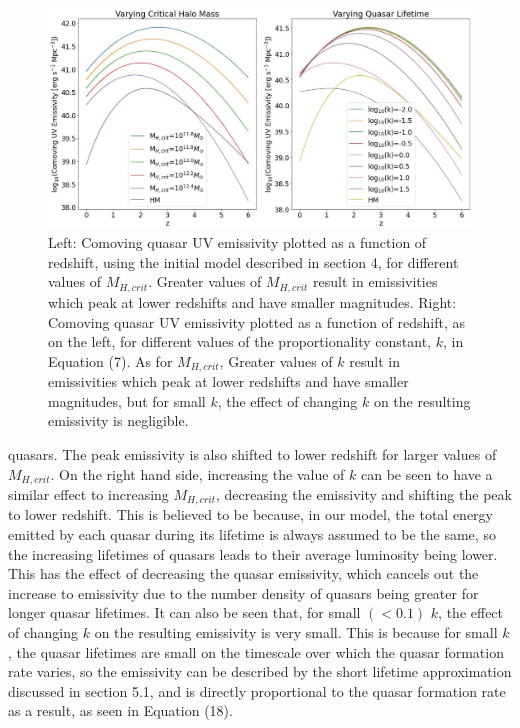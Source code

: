 \documentclass[12pt, twocolumn]{article}%
\begin{document}
 \begin{figure}[H]
     \centering
     \includegraphics[width=\linewidth]{Plot_9.jpeg}
     \caption{Left: Comoving quasar UV emissivity plotted as a function of redshift, using the initial model described in section 4, for different values of $M_{H,crit}$. Greater values of $M_{H,crit}$ result in emissivities which peak at lower redshifts and have smaller magnitudes. Right: Comoving quasar UV emissivity plotted as a function of redshift, as on the left, for different values of the proportionality constant, $k$, in Equation (7). As for $M_{H,crit}$, Greater values of $k$ result in emissivities which peak at lower redshifts and have smaller magnitudes, but for small $k$, the effect of changing $k$ on the resulting emissivity is negligible.}
     \label{fig:11}
 \end{figure}

\twocolumngrid


\noindent quasars. The peak emissivity is also shifted to lower redshift for larger values of $M_{H,crit}$. On the right hand side, increasing the value of $k$ can be seen to have a similar effect to increasing $M_{H,crit}$, decreasing the emissivity and shifting the peak to lower redshift. This is believed to be because, in our model, the total energy emitted by each quasar during its lifetime is always assumed to be the same, so the increasing lifetimes of quasars leads to their average luminosity being lower. This has the effect of decreasing the quasar emissivity, which cancels out the increase to emissivity due to the number density of quasars being greater for longer quasar lifetimes. It can also be seen that, for small $(<0.1)$ $k$, the effect of changing $k$ on the resulting emissivity is very small. This is because for small $k$, the quasar lifetimes are small on the timescale over which the quasar formation rate varies, so the emissivity can be described by the short lifetime approximation discussed in section 5.1, and is directly proportional to the quasar formation rate as a result, as seen in Equation (18).\par
\end{document}

